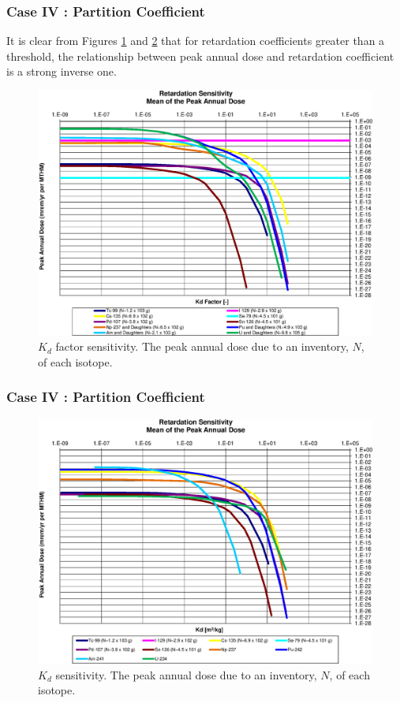 \begin{frame}[c]
  \frametitle{Case IV : Partition Coefficient}
It is clear from Figures \ref{fig:KdSumFactor} and \ref{fig:KdSum} that 
for retardation coefficients greater than a threshold, the 
relationship between peak annual dose and retardation coefficient is a strong 
inverse one. 

\begin{figure}[ht]
\centering
\includegraphics[width=\linewidth]{Sorption/Retardation_Summary_kdFactor.eps}
\caption{$K_d$ factor sensitivity.  The peak annual dose due to an inventory, 
$N$, of each isotope.}
\label{fig:KdSumFactor}
\end{figure}
\end{frame}

\begin{frame}[c]
  \frametitle{Case IV : Partition Coefficient}

\begin{figure}[ht]
\centering
\includegraphics[width=\linewidth]{Sorption/Retardation_Summary_kd.eps}
\caption{$K_d$ sensitivity.  The peak annual dose due to an inventory, 
$N$, of each isotope.}
\label{fig:KdSum}
\end{figure}
\end{frame}

